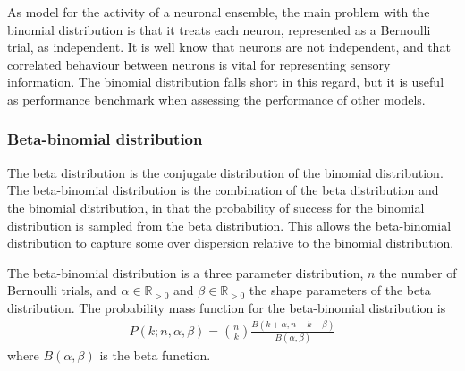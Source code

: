 \documentclass[a4paper,12pt]{article}
\theoremstyle{definition}
\begin{document}


      As model for the activity of a neuronal ensemble, the main problem with the binomial distribution is that it treats each neuron, represented as a Bernoulli trial, as independent. It is well know that neurons are not independent, and that correlated behaviour between neurons is vital for representing sensory information. The binomial distribution falls short in this regard, but it is useful as performance benchmark when assessing the performance of other models.

      \subsubsection{Beta-binomial distribution}
      The beta distribution is the conjugate distribution of the binomial distribution. The beta-binomial distribution is the combination of the beta distribution and the binomial distribution, in that the probability of success for the binomial distribution is sampled from the beta distribution. This allows the beta-binomial distribution to capture some over dispersion relative to the binomial distribution.

      The beta-binomial distribution is a three parameter distribution, $n$ the number of Bernoulli trials, and $\alpha \in \mathbb{R}_{>0}$ and $\beta \in \mathbb{R}_{>0}$ the shape parameters of the beta distribution. The probability mass function for the beta-binomial distribution is
      \begin{align}\label{eq:betabinomial_pdf}
        P(k;n, \alpha, \beta) = \binom{n}{k}\frac{B(k + \alpha, n - k + \beta)}{B(\alpha, \beta)}
      \end{align}
      where $B(\alpha, \beta)$ is the beta function.
\end{document}
